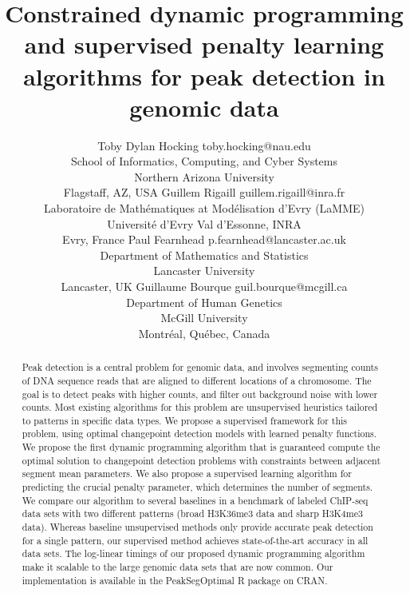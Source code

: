 \documentclass[twoside,11pt]{article}
\begin{document}
\title{Constrained dynamic programming and supervised
penalty learning algorithms for 
peak detection in genomic data}

\author{%
  \name Toby Dylan Hocking \email toby.hocking@nau.edu \\
  \addr School of Informatics, Computing, and Cyber Systems\\
  Northern Arizona University\\
  Flagstaff, AZ, USA
  \AND
  \name Guillem Rigaill \email guillem.rigaill@inra.fr \\
  \addr Laboratoire de Math\'ematiques at Mod\'elisation d'Evry (LaMME)\\
  Universit\'e d'Evry Val d'Essonne, INRA\\
  Evry, France
  \AND
  \name Paul Fearnhead \email p.fearnhead@lancaster.ac.uk \\
  \addr Department of Mathematics and Statistics\\
  Lancaster University\\
  Lancaster, UK
  \AND
  \name Guillaume Bourque \email guil.bourque@mcgill.ca\\
  \addr Department of Human Genetics\\
  McGill University\\
  Montr\'eal, Qu\'ebec, Canada}


\maketitle

\begin{abstract}
  Peak detection is a central problem for genomic data, and involves
  segmenting counts of DNA sequence reads that are aligned to
  different locations of a chromosome. The goal is to detect peaks
  with higher counts, and filter out background noise with lower
  counts.  Most existing algorithms for this problem are unsupervised
  heuristics tailored to patterns in specific data types. We propose a
  supervised framework for this problem, using optimal changepoint
  detection models with learned penalty functions. We propose the
  first dynamic programming algorithm that is guaranteed compute the
  optimal solution to changepoint detection problems with constraints
  between adjacent segment mean parameters. We also propose a
  supervised learning algorithm for predicting the crucial penalty
  parameter, which determines the number of segments. We compare our
  algorithm to several baselines in a benchmark of labeled ChIP-seq
  data sets with two different patterns (broad H3K36me3 data and sharp
  H3K4me3 data). Whereas baseline unsupervised methods only provide
  accurate peak detection for a single pattern, our supervised method
  achieves state-of-the-art accuracy in all data sets. The log-linear
  timings of our proposed dynamic programming algorithm make it
  scalable to the large genomic data sets that are now common. Our
  implementation is available in the PeakSegOptimal R package on CRAN.
\end{abstract}
\end{document}
